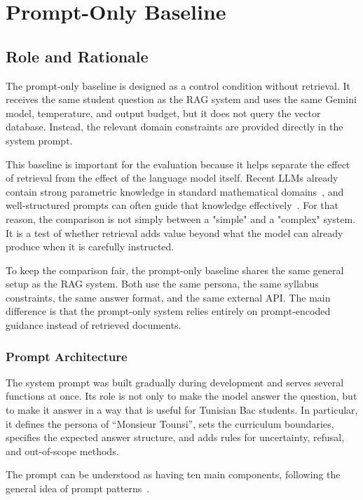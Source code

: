 \section{Prompt-Only Baseline}
\label{sec:prompt-only}

\subsection{Role and Rationale}

The prompt-only baseline is designed as a control condition without
retrieval. It receives the same student question as the RAG system and uses
the same Gemini model, temperature, and output budget, but it does not query
the vector database. Instead, the relevant domain constraints are provided
directly in the system prompt.

This baseline is important for the evaluation because it helps separate the
effect of retrieval from the effect of the language model itself. Recent
LLMs already contain strong parametric knowledge in standard mathematical
domains~\cite{brown2020gpt3,team2023gemini}, and well-structured prompts can
often guide that knowledge effectively~\cite{wei2022chain_of_thought}. For
that reason, the comparison is not simply between a "simple" and a
"complex" system. It is a test of whether retrieval adds value beyond what
the model can already produce when it is carefully instructed.

To keep the comparison fair, the prompt-only baseline shares the same
general setup as the RAG system. Both use the same persona, the same
syllabus constraints, the same answer format, and the same external API.
The main difference is that the prompt-only system relies entirely on
prompt-encoded guidance instead of retrieved documents.

\subsubsection{Prompt Architecture}

The system prompt was built gradually during development and serves several
functions at once. Its role is not only to make the model answer the
question, but to make it answer in a way that is useful for Tunisian Bac
students. In particular, it defines the persona of ``Monsieur Tounsi'', sets
the curriculum boundaries, specifies the expected answer structure, and adds
rules for uncertainty, refusal, and out-of-scope methods.

The prompt can be understood as having ten main components, following the
general idea of prompt patterns~\cite{white2023prompt_patterns}.

